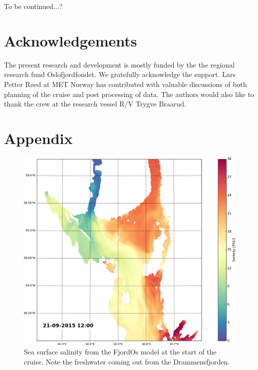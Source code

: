 \documentclass[12pt,a4paper,english]{article}
\begin{document}
To be continued...?



\clearpage
\section*{\hspace{17mm}Acknowledgements}
The present research and development is mostly funded by the the regional research fund Oslofjordfondet. We gratefully acknowledge the support. Lars Petter R\o ed at MET Norway has contributed with valuable discussions of both planning of the cruise and post processing of data. The authors would also like to thank the crew at the research vessel R/V Trygve Braarud. 

\clearpage
\section*{\hspace{17mm}Appendix}

\begin{figure}[ht]
\centerline{
\includegraphics*[width=1.0\textwidth]{Python/salthold_72}}
\caption{\small
Sea surface salinity from the FjordOs model at the start of the cruise. Note the freshwater coming out from the Drammensfjorden.
}
\label{fig:Salinity1}
\end{figure}
\end{document}
